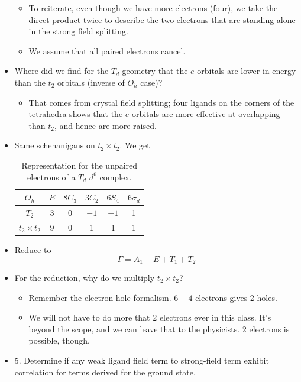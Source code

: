 \documentclass[../notes.tex]{subfiles}
\begin{document}
\begin{itemize}
\begin{itemize}
        \item To reiterate, even though we have more electrons (four), we take the direct product twice to describe the two electrons that are standing alone in the strong field splitting.
        \item We assume that all paired electrons cancel.
    \end{itemize}
    \item Where did we find for the $T_d$ geometry that the $e$ orbitals are lower in energy than the $t_2$ orbitals (inverse of $O_h$ case)?
    \begin{itemize}
        \item That comes from crystal field splitting; four ligands on the corners of the tetrahedra shows that the $e$ orbitals are more effective at overlapping than $t_2$, and hence are more raised.
    \end{itemize}
    \item Same schenanigans on $t_2\times t_2$. We get
    \begin{table}[H]
        \centering
        \small
        \renewcommand{\arraystretch}{1.2}
        \begin{tabular}{c|ccccc}
            $O_h$ & $E$ & $8C_3$ & $3C_2$ & $6S_4$ & $6\sigma_d$\\
            \hline
            $T_2$ & 3 & 0 & $-1$ & $-1$ & 1\\
            $t_2\times t_2$ & 9 & 0 & 1 & 1 & 1\\
        \end{tabular}
        \caption{Representation for the unpaired electrons of a $T_d$ $d^6$ complex.}
        \label{tab:Tdd6RR}
    \end{table}
    \item Reduce to
    \begin{equation*}
        \Gamma = A_1+E+T_1+T_2
    \end{equation*}
    \item For the reduction, why do we multiply $t_2\times t_2$?
    \begin{itemize}
        \item Remember the electron hole formalism. $6-4$ electrons gives 2 holes.
        \item We will not have to do more that 2 electrons ever in this class. It's beyond the scope, and we can leave that to the physicists. 2 electrons is possible, though.
    \end{itemize}
    \item 5. Determine if any weak ligand field term to strong-field term exhibit correlation for terms derived for the ground state.

\end{itemize}
\end{document}
